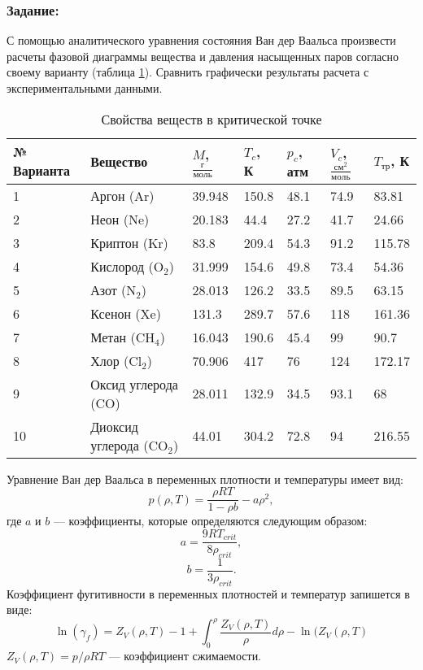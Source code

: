 \subsubsection{Задание:}
С помощью аналитического уравнения состояния Ван дер Ваальса произвести расчеты фазовой диаграммы вещества и давления насыщенных паров согласно своему варианту (таблица \ref{tab:eos.task}). Сравнить графически результаты расчета с экспериментальными данными.
\begin{table}[h]
	\caption{Свойства веществ в критической точке}
	\label{tab:eos.task}
	\begin{tabularx}{\textwidth}%
		{|p{}
		|p{}
		|X
		|X
		|X
		|X
		|X|
		}
		\hline
		№ Варианта & Вещество  & $M$, $\frac{г}{моль}$  & $T_{c}$, К  & $p_{c}$, атм  & $V_{c}$, ${\frac{см^2}{моль}}$ & $T_{тр}$, К  \\ \hline \hline
		1 & Аргон (Ar)  & 39.948  & 150.8 & 48.1 & 74.9 & 83.81 \\ \hline
		2 & Неон (Ne) & 20.183 & 44.4 & 27.2 & 41.7 & 24.66 \\ \hline
		3 & Криптон (Kr) & 83.8 & 209.4 & 54.3 & 91.2 & 115.78 \\ \hline
		4 & Кислород ($\mathrm{O_2}$) & 31.999 & 154.6 & 49.8 & 73.4 & 54.36\\ \hline
		5 & Азот ($\mathrm{N_2}$) & 28.013 & 126.2 & 33.5 & 89.5 & 63.15 \\ \hline
		6 & Ксенон (Xe) & 131.3 & 289.7 & 57.6 & 118 & 161.36 \\ \hline
		7 & Метан ($\mathrm{CH_4}$) & 16.043 & 190.6 & 45.4 & 99 & 90.7 \\ \hline
		8 & Хлор ($\mathrm{Cl_2}$) & 70.906 & 417 & 76 & 124 & 172.17 \\ \hline
		9 & Оксид углерода (CO) & 28.011 & 132.9 & 34.5 & 93.1 & 68 \\ \hline
		10 & Диоксид углерода ($\mathrm{CO_2}$) &44.01 & 304.2 & 72.8 & 94 &	216.55 \\ \hline
	\end{tabularx}
\end{table}
	
	Уравнение Ван дер Ваальса в переменных плотности и температуры имеет вид:
	\begin{equation*}
		p(\rho,T)=\dfrac{\rho R T}{1-\rho b} - a \rho^2,
	\end{equation*}
	где $a$ и $b$ --- коэффициенты, которые определяются следующим образом:
	\begin{equation*}
		a=\dfrac{9 R T_{crit}}{8 \rho_{crit}},
	\end{equation*}
	\begin{equation*}
		b=\dfrac{1}{3 \rho_{crit}}.
	\end{equation*}
	Коэффициент фугитивности в переменных плотностей и температур запишется в виде:
	\begin{equation*}
		\ln(\gamma_f)=Z_V(\rho,T)-1+\int_{0}^{\rho} \dfrac{Z_V(\rho,T)}{\rho} d\rho -\ln(Z_V(\rho,T)
	\end{equation*}
	$Z_V(\rho,T)=p/{\rho R T}$ --- коэффициент сжимаемости.

